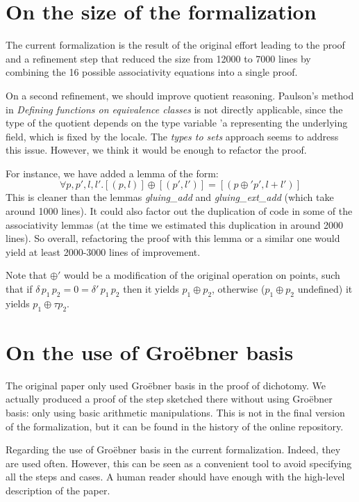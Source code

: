 \documentclass[runningheads]{llncs}
\begin{document}
\section{On the size of the formalization}

The current formalization is the result of the original effort leading to the proof and a refinement step that reduced the size from 12000 to 7000 lines by combining the 16 possible associativity equations into a single proof.

On a second refinement, we should improve quotient reasoning. Paulson's method in \textit{Defining functions on equivalence classes} is not directly applicable, since the type of the quotient depends on the type variable 'a representing the underlying field, which is fixed by the locale. The \textit{types to sets} approach seems to address this issue. However, we think it would be enough to refactor the proof. 

For instance, we have added a lemma of the form: \[\forall p,p',l,l'. [(p,l)] \oplus [(p',l')] = [(p \oplus' p', l+l')]\] This is cleaner than the lemmas \textit{gluing\_add} and \textit{gluing\_ext\_add} (which take around 1000 lines). It could also factor out the duplication of code in some of the associativity lemmas (at the time we estimated this duplication in around 2000 lines). So overall, refactoring the proof with this lemma or a similar one would yield at least 2000-3000 lines of improvement. 

Note that $\oplus'$ would be a modification of the original operation on points, such that if  $\delta \, p_1 \, p_2 = 0 = \delta' \, p_1 \, p_2$ then it yields $p_1 \oplus p_2$, otherwise ($p_1 \oplus p_2$ undefined) it yields $p_1 \oplus \tau p_2$.

\section{On the use of Gro\"ebner basis}

The original paper only used Gro\"ebner basis in the proof of dichotomy. We actually produced a proof of the step sketched there without using Gro\"ebner basis: only using basic arithmetic manipulations. This is not in the final version of the formalization, but it can be found in the history of the online repository.

Regarding the use of Gro\"ebner basis in the current formalization. Indeed, they are used often. However, this can be seen as a convenient tool to avoid specifying all the steps and cases. A human reader should have enough with the high-level description of the paper. 
\end{document}
